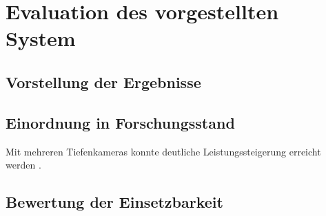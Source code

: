 \chapter{Evaluation des vorgestellten System}

\section{Vorstellung der Ergebnisse}

\section{Einordnung in Forschungsstand}
Mit mehreren Tiefenkameras konnte deutliche Leistungssteigerung erreicht werden \cite{multipleDepthCameras}.

\section{Bewertung der Einsetzbarkeit}